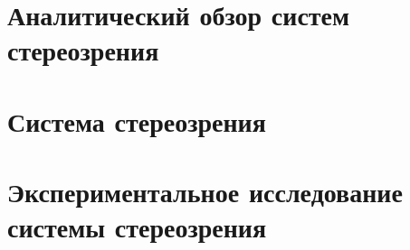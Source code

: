 \documentclass[a4paper,14pt]{extarticle} %
\begin{document}



\tableofcontents %
\clearpage


\section{Аналитический обзор систем стереозрения}





\newpage
\section{Система стереозрения}

\newpage
\section{Экспериментальное исследование системы стереозрения}

\newpage
{}

\newpage
{}
\printbibliography[heading=none] %


\newpage

\end{document}
